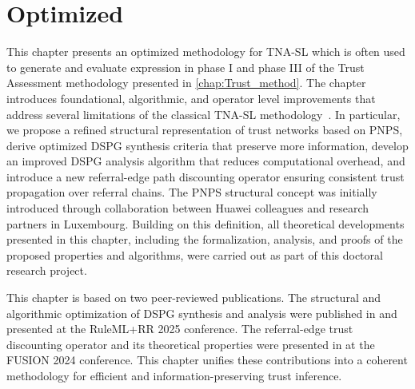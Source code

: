 
\chapter{Optimized }
\label{chap:tnasl}
This chapter presents an optimized methodology for \acf{TNA-SL} which is often used to generate and evaluate expression in phase I and phase III of the Trust Assessment methodology presented in \cref{chap:Trust_method}. The chapter introduces foundational, algorithmic, and operator level improvements that address several limitations of the classical \ac{TNA-SL} methodology~\cite{4622580}. In particular, we propose a refined structural representation of trust networks based on \acf{PNPS}, derive optimized \ac{DSPG} synthesis criteria that preserve more information, develop an improved \ac{DSPG} analysis algorithm that reduces computational overhead, and introduce a new referral-edge path discounting operator ensuring consistent trust propagation over referral chains. The \ac{PNPS} structural concept was initially introduced through collaboration between Huawei colleagues and research partners in Luxembourg. Building on this definition, all theoretical developments presented in this chapter, including the formalization, analysis, and proofs of the proposed properties and algorithms, were carried out as part of this doctoral research project.

This chapter is based on two peer-reviewed publications. The structural and algorithmic optimization of \ac{DSPG} synthesis and analysis were published in \cite{10.1007/978-3-032-08887-1_4} and presented at the RuleML+RR 2025 conference. The referral-edge trust discounting operator and its theoretical properties were presented in \cite{10706345} at the FUSION 2024 conference. This chapter unifies these contributions into a coherent methodology for efficient and information-preserving trust inference.

